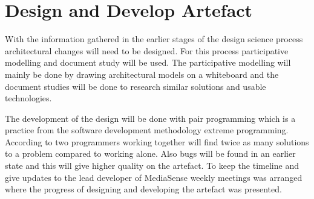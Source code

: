 \section{Design and Develop Artefact}
With the information gathered in the earlier stages of the design science process architectural changes will need to be designed. For this process participative modelling \cite{johannesson2012design} and document study will be used. The participative modelling will mainly be done by drawing architectural models on a whiteboard and the document studies will be done to research similar solutions and usable technologies. 

The development of the design will be done with pair programming \cite{williams2000all} which is a practice from the software development methodology extreme programming. According to  \cite{williams2000all} two programmers working together will find twice as many solutions to a problem compared to working alone. Also bugs will be found in an earlier state and this will give higher quality on the artefact. To keep the timeline and give updates to the lead developer of MediaSense weekly meetings was arranged where the progress of designing and developing the artefact was presented. 